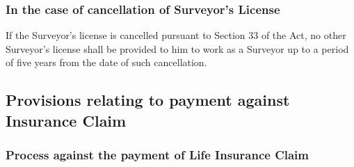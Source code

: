 \subsubsection{In the case of cancellation of Surveyor's License}
If the Surveyor's license is cancelled pursuant to Section 33 of the Act, no other Surveyor's license shall be provided to him to work as a Surveyor up to a period of five years from the date of such cancellation.
\subsection{Provisions relating to payment against Insurance Claim}
\subsubsection{Process against the payment of Life Insurance Claim}
